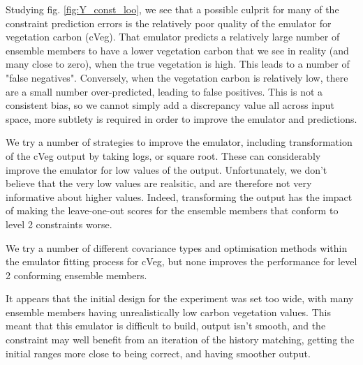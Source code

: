 \documentclass[gmd, manuscript]{copernicus}
\begin{document}
Studying fig. \ref{fig:Y_const_loo}, we see that a possible culprit for many of the constraint prediction errors is the relatively poor quality of the emulator for vegetation carbon (cVeg). That emulator predicts a relatively large number of ensemble members to have a lower vegetation carbon that we see in reality (and many close to zero), when the true vegetation is high. This leads to a number of "false negatives". Conversely, when the vegetation carbon is relatively low, there are a small number over-predicted, leading to false positives. This is not a consistent bias, so we cannot simply add a discrepancy value all across input space, more subtlety is required in order to improve the emulator and predictions.

We try a number of strategies to improve the emulator, including transformation of the cVeg output by taking logs, or square root. These can considerably improve the emulator for low values of the output. Unfortunately, we don't believe that the very low values are realsitic, and are therefore not very informative about higher values. Indeed, transforming the output has the impact of making the leave-one-out scores for the ensemble members that conform to level 2 constraints worse.

We try a number of different covariance types and optimisation methods within the emulator fitting process for cVeg, but none improves the performance for level 2 conforming ensemble members.

It appears that the initial design for the experiment was set too wide, with many ensemble members having unrealistically low carbon vegetation values. This meant that this emulator is difficult to build, output isn't smooth, and the constraint may well benefit from an iteration of the history matching, getting the initial ranges more close to being correct, and having smoother output.
\end{document}
